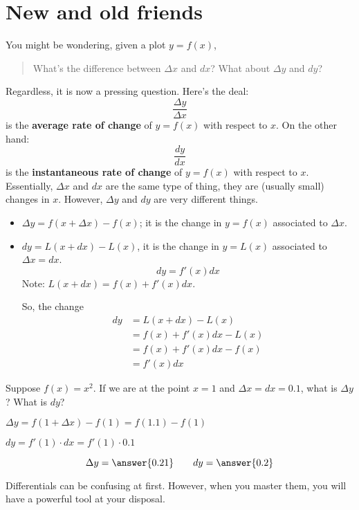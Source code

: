 \documentclass{ximera}
\begin{document}
\section{New and old friends}

You might be wondering, given a plot $y=f(x)$,
\begin{quote}
  What's the difference between $\Delta x$ and $dx$? What about
  $\Delta y$ and $dy$?
\end{quote}
Regardless, it is now a pressing question. Here's the deal: 
\[
\frac{\Delta y}{\Delta x}
\]
is the \textbf{average rate of change} of $y=f(x)$ with respect to $x$.
On the other hand:
\[
\frac{dy}{dx}
\]
is the \textbf{instantaneous rate of change} of $y=f(x)$ with respect to
$x$. Essentially, $\Delta x$ and $dx$ are the same type of thing,
they are (usually small) changes in $x$. However, $\Delta y$ and $dy$ are very different things.
\begin{itemize}
\item $\Delta y=f(x+\Delta x)-f(x)$; it  is the change in $y=f(x)$ associated to $\Delta x$.
\item $dy=L(x+dx)-L(x)$, it is the change in $y=L(x)$ associated to $\Delta x=dx$.
  \[
  dy =f'(x)dx
  \]
  Note: $ L(x+dx)= f(x)+f'(x)dx$.
   
  So, the change
  \begin{align*}
    dy &= L(x+dx)-L(x)\\
    &= f(x)+f'(x)dx-L(x)\\
    &= f(x)+f'(x)dx-f(x)\\
    &=f'(x)dx
  \end{align*}
\end{itemize}
\begin{question}
  Suppose $f(x) = x^2$. If we are at the point $x=1$ and $\Delta x =dx
  = 0.1$, what is $\Delta y$? What is $dy$?
  \begin{hint}
 $ \Delta y=f(1+\Delta x)-f(1)=f(1.1)-f(1)$
    \end{hint}
      \begin{hint}
 $dy=f'(1)\cdot dx=f'(1)\cdot0.1$
    \end{hint}
  \begin{prompt}
    \[
    \Delta y = \answer{0.21}\qquad dy = \answer{0.2}
    \]
  \end{prompt}
\end{question}
Differentials can be confusing at first. However, when you master
them, you will have a powerful tool at your disposal.
\end{document}
